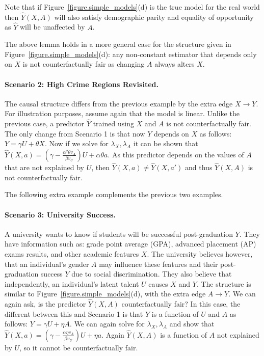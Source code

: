 Note that if Figure~\ref{figure.simple_models}(d) is the
true model for the real world then $\hat Y(X,A)$ will also satisfy
demographic parity and equality of opportunity as $\hat Y$ will be
unaffected by $A$. 

The above lemma holds in a more general case for the structure given
in Figure~\ref{figure.simple_models}(d): any non-constant
estimator that depends only on $X$ is not counterfactually fair as
changing $A$ always alters $X$.

\paragraph{Scenario 2: High Crime Regions Revisited.}

The causal structure differs from the previous example by the extra
edge $X \rightarrow Y$. For illustration purposes, assume again that
the model is linear. Unlike the previous case, a predictor $\hat Y$
trained using $X$ and $A$ is not counterfactually fair. The only
change from Scenario 1 is that now $Y$ depends on $X$ as follows: $Y
\!=\! \gamma U + \theta X$. Now if we solve for $\lambda_X,\lambda_A$
it can be shown that $\hat Y(X,a) \!=\! (\gamma - \frac{\alpha^2
  \theta v_A}{\beta v_U})U + \alpha \theta a$. As this predictor
depends on the values of $A$ that are not explained by $U$, then
$\hat Y(X,a) \!\neq\! \hat Y(X,a')$ and thus $\hat Y(X,A)$ is not
counterfactually fair.

The following extra example complements the previous two examples.

\paragraph{Scenario 3: University Success.}
A university wants to know if students will be successful
post-graduation $Y$. They have information such as: grade point
average (GPA), advanced placement (AP) exams results, and other
academic features $X$. The university believes however, that an
individual's gender $A$ may influence these features and their
post-graduation success $Y$ due to social discrimination. They also
believe that independently, an individual's latent talent $U$ causes
$X$ and $Y$. The structure is similar to
Figure~\ref{figure.simple_models}(d), with the extra
edge $A \rightarrow Y$. We can again ask, is the predictor $\hat
Y(X,A)$ counterfactually fair? In this case, the different between
this and Scenario 1 is that $Y$ is a function of $U$ and $A$ as
follows: $Y \!=\! \gamma U + \eta A$. We can again solve for
$\lambda_X,\lambda_A$ and show that $\hat Y(X,a) \!=\! (\gamma -
\frac{\alpha \eta v_A}{\beta v_U})U + \eta a$. Again $\hat Y(X,A)$ is
a function of $A$ not explained by $U$, so it cannot be counterfactually fair.

